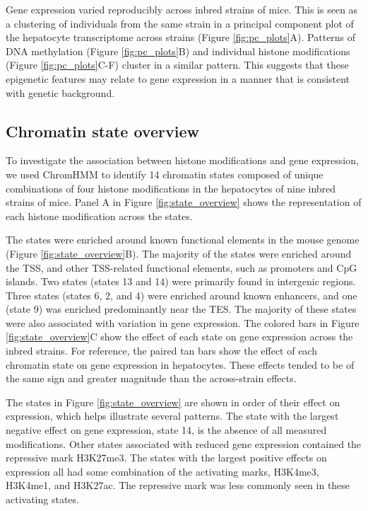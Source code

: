 \documentclass[10pt,letterpaper]{article}
\begin{document}
Gene expression varied reproducibly across inbred strains of mice. This
is seen as a clustering of individuals from the same strain in a
principal component plot of the hepatocyte transcriptome across strains
(Figure \ref{fig:pc_plots}A). Patterns of DNA methylation (Figure
\ref{fig:pc_plots}B) and individual histone modifications (Figure
\ref{fig:pc_plots}C-F) cluster in a similar pattern. This suggests that
these epigenetic features may relate to gene expression in a manner that
is consistent with genetic background.

\hypertarget{chromatin-state-overview}{%
\subsection{Chromatin state overview}\label{chromatin-state-overview}}

To investigate the association between histone modifications and gene
expression, we used ChromHMM to identify 14 chromatin states composed of
unique combinations of four histone modifications in the hepatocytes of
nine inbred strains of mice. Panel A in Figure \ref{fig:state_overview}
shows the representation of each histone modification across the states.

The states were enriched around known functional elements in the mouse
genome (Figure \ref{fig:state_overview}B). The majority of the states
were enriched around the TSS, and other TSS-related functional elements,
such as promoters and CpG islands. Two states (states 13 and 14) were
primarily found in intergenic regions. Three states (states 6, 2, and 4)
were enriched around known enhancers, and one (state 9) was enriched
predominantly near the TES. The majority of these states were also
associated with variation in gene expression. The colored bars in Figure
\ref{fig:state_overview}C show the effect of each state on gene
expression across the inbred strains. For reference, the paired tan bars
show the effect of each chromatin state on gene expression in
hepatocytes. These effects tended to be of the same sign and greater
magnitude than the across-strain effects.

The states in Figure \ref{fig:state_overview} are shown in order of
their effect on expression, which helps illustrate several patterns. The
state with the largest negative effect on gene expression, state 14, is
the absence of all measured modifications. Other states associated with
reduced gene expression contained the repressive mark H3K27me3. The
states with the largest positive effects on expression all had some
combination of the activating marks, H3K4me3, H3K4me1, and H3K27ac. The
repressive mark was less commonly seen in these activating states.
\end{document}
